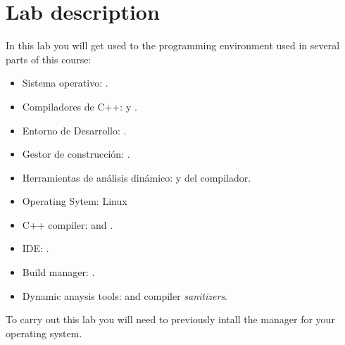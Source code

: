 \section{Lab description}

In this lab you will get used to the programming environment used in 
several parts of this course:

\begin{itemize}

  \item Sistema operativo: .

  \item Compiladores de C++:  y .

  \item Entorno de Desarrollo: .

  \item Gestor de construcción: .

  \item Herramientas de análisis dinámico:  y
 del compilador.



  \item Operating Sytem: Linux

  \item C++ compiler:  and .

  \item IDE: .

  \item Build manager: .

  \item Dynamic anaysis tools: 
         and 
        compiler \emph{sanitizers}.

\end{itemize}

To carry out this lab you will need to previously intall the  manager for your operating system.
